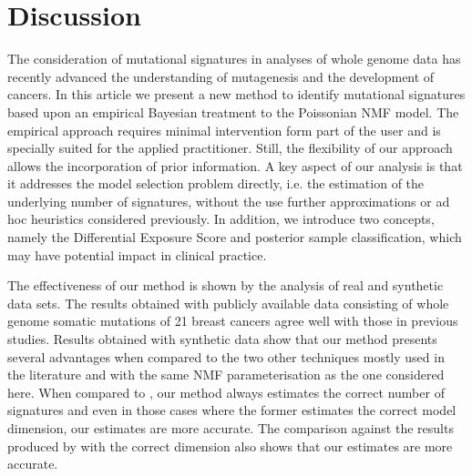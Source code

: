 \documentclass{bioinfo}
\begin{document}
\section{Discussion}
The consideration of mutational signatures in analyses of whole genome
data has recently advanced the understanding of mutagenesis and the
development of cancers. In this article we present a new method to
identify mutational signatures based upon an empirical Bayesian
treatment to the Poissonian NMF model. The empirical approach requires
minimal intervention form part of the user and is specially suited for
the applied practitioner. Still, the flexibility of our approach allows
the incorporation of prior information. A key aspect of our analysis
is that it addresses the model selection problem directly,
i.e. the estimation of the underlying number of signatures, without
the use further approximations or ad hoc heuristics considered
previously. In addition, we introduce two concepts, namely the
Differential Exposure Score and posterior sample classification, which
may have potential impact in clinical practice.

The effectiveness of our method is shown by the analysis of real and
synthetic data sets. The results obtained with publicly available
data consisting of whole genome somatic mutations of 21 breast
cancers agree well with those in previous studies. Results obtained
with synthetic data show that our method presents several advantages
when compared to the two other techniques mostly used in the
literature and with the same NMF parameterisation as the one
considered here. When compared to \cite{FICMV}, our
method always estimates the correct number of signatures and even in
those cases where the former estimates the correct model dimension,
our estimates are more accurate. The comparison against the results
produced by \cite{A} with the correct dimension also shows that
our estimates are more accurate.
\end{document}
